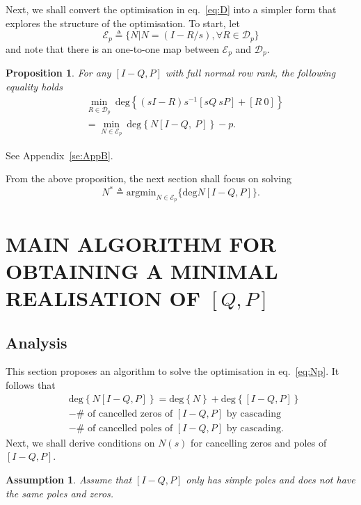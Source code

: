 \documentclass[twocolumn,12pt]{autart}
\theoremstyle{plain}
\newtheorem{proposition}{Proposition}
\newtheorem{assumption}{Assumption}
\newenvironment{proof}[1][Proof]{\begin{trivlist} \item[\hskip \labelsep {\bfseries #1}]}{\end{trivlist}}
\begin{document}
Next, we shall convert the optimisation in eq.~\eqref{eq:D} into a simpler form that explores the structure of the optimisation. To start,  
let 
\begin{equation}\label{eq:ep}
\mathcal{E}_p\triangleq\{N| N=(I-R/s), \forall R\in\mathcal{D}_p\}
\end{equation}
and note that there is an one-to-one map between $\mathcal{E}_p$ and $\mathcal{D}_p$.

\begin{proposition}\label{prop:convert}
For any $[I-Q,P]$ with full normal row rank, the following equality holds
\begin{align}
&\min_{R\in\mathcal{D}_p} ~\text{deg}\left\{(s{I}-{R})s^{-1}[s{Q}~s{P}]+[{R}~{0}]\right\}\nonumber\\
&=\min_{N\in\mathcal{E}_p} ~\text{deg} \left\{N[I-{Q},~{P}]\right\}-p.
\end{align}
\end{proposition}
\begin{proof}
See Appendix~\ref{se:AppB}. 
\end{proof}

From the above proposition, the next section shall focus on solving
\begin{equation}\label{eq:Np}
N^* \triangleq\text{argmin}_{N\in\mathcal{E}_p} \{\text{deg}N[I-Q,P]\}.
\end{equation}






\section{MAIN ALGORITHM FOR OBTAINING A MINIMAL REALISATION OF $[Q,P]$}
\subsection{Analysis}\label{se:4.1}
This section proposes an algorithm to solve the optimisation in eq.~\eqref{eq:Np}. It follows that
\begin{align}
&\text{deg}\left\{N[I-{Q},{P}]\right\}=\text{deg}\left\{N\right\}+\text{deg}\left\{[I-{Q},{P}]\right\}\nonumber\\
&-\text{$\#$ of cancelled zeros of $[I-Q,P]$ by cascading} \nonumber\\
 &- \text{$\#$ of cancelled poles of $[I-Q,P]$ by cascading}. \label{eq:degree}
\end{align}
Next, we shall derive conditions on $N(s)$ for cancelling zeros and poles of $[I-Q,P]$. 
\begin{assumption}\label{ass:1}
Assume that $[I-Q,P]$ only has simple poles and does not have the same poles and zeros. 
\end{assumption}
\end{document}
